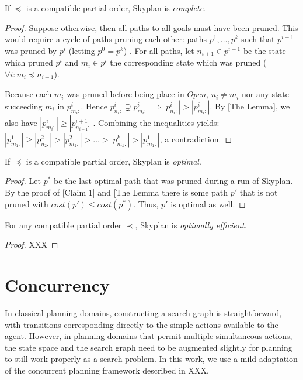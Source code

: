\documentclass[letterpaper]{article}
\theoremstyle{plain} \newtheorem{theorem}{Theorem} \newtheorem{proposition}{Proposition} \newtheorem{lemma}{Lemma}
\theoremstyle{definition} \newtheorem{definition}{Definition} \newtheorem{conjecture}{Conjecture} \newtheorem*{example}{Example}
\theoremstyle{remark} \newtheorem*{remark}{Remark} \newtheorem*{note}{Note} \newtheorem{case}{Case}
\begin{document}
\begin{claim}{}\label{clm-complete}
   If $\preceq$ is a compatible partial order, Skyplan
is \emph{complete}.
\end{claim}
\begin{proof}
Suppose otherwise, then all paths to all goals must
have been pruned. This would require a cycle of paths pruning each other: 
paths $p^{1},\dots,p^{k}$ such that $p^{i+1}$ was pruned by $p^{i}$ (letting $p^{0}=p^{k}$) .
For all paths, let $n_{i+1} \in p^{i+1}$ be the state which pruned $p^{i}$ and
$m_{i} \in p^{i}$ the corresponding state which was pruned 
($\forall i: m_{i} \preceq n_{i+1}$).

Because each $m_{i}$ was pruned before being place in $Open$,
$n_{i} \neq m_{i}$ nor any state succeeding $m_{i}$ in $p^{i}_{m_{i}:}$.
Hence $p^{i}_{n_{i}:} \supsetneq p^{i}_{m_{i}:} \implies |p^{i}_{n_{i}:}| > |p^{i}_{m_{i}:}|$.
By [The Lemma], we also have %
 $|p^{i}_{m_{i}:}| \geq |p^{i+1}_{n_{i+1}:}|$. Combining the
inequalities yields: $|p^{1}_{m_{1}:}| \geq |p^{2}_{n_{2}:}| > |p^{2}_{m_{2}:}| > \dots > |p^{k}_{m_{k}:}| > |p^{1}_{m_{1}:}|$, 
a contradiction.
\end{proof}
  
\begin{claim}{}\label{clm-optimal}
   If $\preceq$ is a compatible partial order, Skyplan
is \emph{optimal}.
\end{claim}
\begin{proof} 
Let $p^{*}$ be the last optimal path that was pruned during a run of Skyplan. 
By the proof of [Claim 1] and [The Lemma %
there is some path $p\prime$ that is not pruned with $cost(p\prime) \leq cost(p^{*})$.
Thus, $p\prime$ is optimal as well.
\end{proof}



\begin{claim}{}\label{clm-optimally-efficient}
For any compatible partial order $\prec$, Skyplan is \emph{optimally efficient}.
\end{claim}
\begin{proof} XXX \end{proof}
	

\section{Concurrency}

In classical planning domains, constructing a search graph is straightforward, with
transitions corresponding directly to the simple actions available to the agent. However,
in planning domains that permit multiple simultaneous actions, the state space and the
search graph need to be augmented slightly for planning to still work properly as a search
problem. In this work, we use a mild adaptation of the concurrent planning framework described in XXX.
\end{document}
